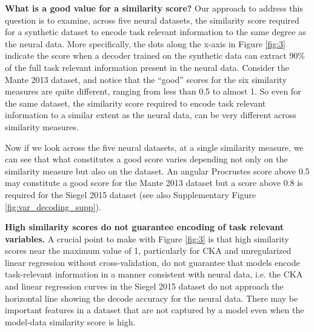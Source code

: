 \documentclass{article} %
\begin{document}
\textbf{What is a good value for a similarity score?}
Our approach to address this question is to examine, across five neural datasets, the similarity score required for a synthetic dataset to encode task relevant information to the same degree as the neural data.
More specifically, the dots along the x-axis in Figure \ref{fig:3} indicate the score when a decoder trained on the synthetic data can extract 90\% of the full task relevant information present in the neural data. Consider the Mante 2013 dataset, and notice that the “good” scores for the six similarity measures are quite different, ranging from less than 0.5 to almost 1. So even for the same dataset, the similarity score required to encode task relevant information to a similar extent as the neural data, can be very different across similarity measures.

Now if we look across the five neural datasets, at a single similarity measure, we can see that what constitutes a good score varies depending not only on the similarity measure but also on the dataset. An angular Procrustes score above 0.5 may constitute a good score for the Mante 2013 dataset but a score above 0.8 is required for the Siegel 2015 dataset (see also Supplementary Figure \ref{fig:var_decoding_supp}).

\textbf{High similarity scores do not guarantee encoding of task relevant variables.}
A crucial point to make with Figure \ref{fig:3} is that high similarity scores near the maximum value of 1, particularly for CKA and unregularized linear regression without cross-validation, do not guarantee that models encode task-relevant information in a manner consistent with neural data, i.e. the CKA and linear regression curves in the Siegel 2015 dataset do not approach the horizontal line showing the decode accuracy for the neural data. There may be important features in a dataset that are not captured by a model even when the model-data similarity score is high.
\end{document}
